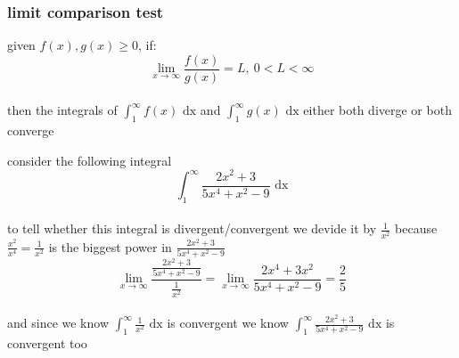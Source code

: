 \documentclass[a4paper,12pt]{article}
\newcommand{\?}{\stackrel{?}{=}}
\begin{document}
\subsubsection{limit comparison test}
\label{sec:org572bf4d}
\begin{definition}
given \(f(x),g(x) \geq 0\), if:\\[0pt]
\[
  \lim_{x\to\infty} \frac{f(x)}{g(x)} = L,\ 0 < L < \infty
\]\\[0pt]
then the integrals of \(\int_1^\infty f(x) \text{ dx}\) and \(\int_1^\infty g(x) \text{ dx}\) either both diverge or both converge\\[0pt]

\begin{my_example}
consider the following integral\\[0pt]
\[
  \int_1^\infty \frac{2x^2 + 3}{5x^4 + x^2 - 9} \text{ dx}
\]\\[0pt]
to tell whether this integral is divergent/convergent we devide it by \(\frac{1}{x^2}\) because \(\frac{x^2}{x^4} = \frac{1}{x^2}\) is the biggest power in \(\frac{2x^2 + 3}{5x^4 + x^2 - 9}\)\\[0pt]
\[
  \lim_{x\to\infty} \frac{\frac{2x^2 + 3}{5x^4 + x^2 - 9}}{\frac{1}{x^2}} = \lim_{x\to\infty} \frac{2x^4+3x^2}{5x^4+x^2-9} = \frac25
\]\\[0pt]
and since we know \(\int_1^\infty \frac{1}{x^2} \text{ dx}\) is convergent we know \(\int_1^\infty \frac{2x^2 + 3}{5x^4 + x^2 - 9} \text{ dx}\) is convergent too\\[0pt]
\end{my_example}
\end{definition}
\end{document}

